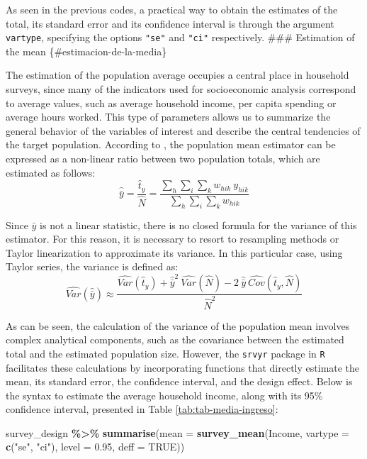 \documentclass[
  english,
  12pt,
]{book}
\newenvironment{Shaded}{\begin{snugshade}}{\end{snugshade}}
\newcommand{\AttributeTok}[1]{\textcolor[rgb]{0.13,0.29,0.53}{#1}}
\newcommand{\ConstantTok}[1]{\textcolor[rgb]{0.56,0.35,0.01}{#1}}
\newcommand{\FloatTok}[1]{\textcolor[rgb]{0.00,0.00,0.81}{#1}}
\newcommand{\FunctionTok}[1]{\textcolor[rgb]{0.13,0.29,0.53}{\textbf{#1}}}
\newcommand{\NormalTok}[1]{#1}
\newcommand{\SpecialCharTok}[1]{\textcolor[rgb]{0.81,0.36,0.00}{\textbf{#1}}}
\newcommand{\StringTok}[1]{\textcolor[rgb]{0.31,0.60,0.02}{#1}}
\begin{document}
As seen in the previous codes, a practical way to obtain the estimates of the total, its standard error and its confidence interval is through the argument \texttt{vartype}, specifying the options \texttt{"se"} and \texttt{"ci"} respectively.
\#\#\# Estimation of the mean \{\#estimacion-de-la-media\}

The estimation of the population average occupies a central place in household surveys, since many of the indicators used for socioeconomic analysis correspond to average values, such as average household income, per capita spending or average hours worked. This type of parameters allows us to summarize the general behavior of the variables of interest and describe the central tendencies of the target population. According to \citet{Gutierrez2016}, the population mean estimator can be expressed as a non-linear ratio between two population totals, which are estimated as follows:
\[
\hat{\bar{y}}=  \frac{\hat{t}_y}{\hat{N}}  =  \frac{\sum_{h}\sum_{i}\sum_{k} w_{h i k} \ y_{hik}}{\sum_{h}\sum_{i}\sum_{k} w_{h i k}}
\]

Since \(\hat{\bar{y}}\) is not a linear statistic, there is no closed formula for the variance of this estimator. For this reason, it is necessary to resort to resampling methods or Taylor linearization to approximate its variance. In this particular case, using Taylor series, the variance is defined as:
\[
\widehat{Var}\left(\hat{\bar{y}}\right)  \approx  \frac{\widehat{Var}\left(\hat{t}_y\right)+\hat{\bar{y}}^{2}\ \widehat{Var}\left(\hat{N}\right)-2\ \hat{\bar{y}} \  \widehat{Cov}\left(\hat{t}_y,\hat{N}\right)}{\hat{N}^{2}}
\]

As can be seen, the calculation of the variance of the population mean involves complex analytical components, such as the covariance between the estimated total and the estimated population size. However, the \texttt{srvyr} package in \texttt{R} facilitates these calculations by incorporating functions that directly estimate the mean, its standard error, the confidence interval, and the design effect. Below is the syntax to estimate the average household income, along with its 95\% confidence interval, presented in Table \ref{tab:tab-media-ingreso}:

\begin{Shaded}
\begin{Highlighting}[]
\NormalTok{survey\_design }\SpecialCharTok{\%\textgreater{}\%}
  \FunctionTok{summarise}\NormalTok{(}\AttributeTok{mean =} \FunctionTok{survey\_mean}\NormalTok{(Income,}
                                \AttributeTok{vartype =} \FunctionTok{c}\NormalTok{(}\StringTok{"se"}\NormalTok{, }\StringTok{"ci"}\NormalTok{),}
                                \AttributeTok{level =} \FloatTok{0.95}\NormalTok{,}
                                \AttributeTok{deff =} \ConstantTok{TRUE}\NormalTok{))}
\end{Highlighting}
\end{Shaded}
\end{document}
